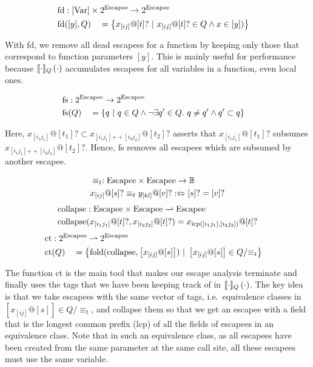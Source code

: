 \newcommand{\collapse}{\mathrm{collapse}}

\begin{alignat*}{3}
	\fd &: \mathrlap{[\Var] \times 2^{\Escapee} \to 2^{\Escapee}} \\
	\fd&([y], Q) &&= \left\{x_{[ij]}@[t]? \ |\ x_{[ij]}@[t]? \in Q \land x \in [y]) \right\}
\end{alignat*}

With fd, we remove all dead escapees for a function by keeping only those that correspond to function parameters $[y]$. This is mainly useful for performance because $\llbracket {\cdot} \rrbracket_Q \left( {\cdot} \right)$ accumulates escapees for all variables in a function, even local ones.

\newcommand{\concat}{\mathrm{++}}

\begin{alignat*}{3}
	\fs &: \mathrlap{2^{\Escapee} \to 2^{\Escapee}} \\
	\fs&(Q) &&= \left\{q \ |\ q \in Q \land \lnot \exists q' \in Q.\ q \neq q' \land q' \subset q\right\}
\end{alignat*}

Here, $x_{[i_1j_1]} @ [t_1]? \subset x_{[i_1j_1]\concat[i_2j_2]} @ [t_2]?$ asserts that $x_{[i_1j_1]} @ [t_1]?$ subsumes $x_{[i_1j_1]\concat[i_2j_2]} @ [t_2]?$. Hence, fs removes all escapees which are subsumed by another escapee.

\begin{alignat*}{1}
	&\equiv_t : \mathrm{Escapee} \times \mathrm{Escapee} \to \mathbb{B} \\
	&x_{[ij]} @ [s]? \equiv_t y_{[kl]} @ [v]? :\Leftrightarrow [s]? = [v]?
\end{alignat*}
\begin{align*}
	\collapse &: \Escapee \times \Escapee \rightharpoonup \Escapee \\
	\collapse&(x_{[i_1j_1]} @ [t]?, x_{[i_2j_2]} @ [t]?) = x_{\mathrm{lcp}([i_1j_1], [i_2j_2])} @ [t]?
\end{align*}
\begin{alignat*}{3}
	\ct &: \mathrlap{2^{\Escapee} \rightharpoonup 2^{\Escapee}} \\
	\ct&(Q) &&= \left\{\mathrm{fold}(\collapse, \left[x_{[ij]} @ [s]\right])\ |\ \left[x_{[ij]} @ [s]\right] \in Q/{\equiv_t} \right\}
\end{alignat*}

The function ct is the main tool that makes our escape analysis terminate and finally uses the tags that we have been keeping track of in $\llbracket {\cdot} \rrbracket_Q \left( {\cdot} \right)$. The key idea is that we take escapees with the same vector of tags, i.e.\ equivalence classes in $\left[x_{[ij]} @ [s]\right] \in Q/{\equiv_t}$, and collapse them so that we get an escapee with a field that is the longest common prefix (lcp) of all the fields of escapees in an equivalence class. Note that in such an equivalence class, as all escapees have been created from the same parameter at the same call site, all these escapees must use the same variable.

